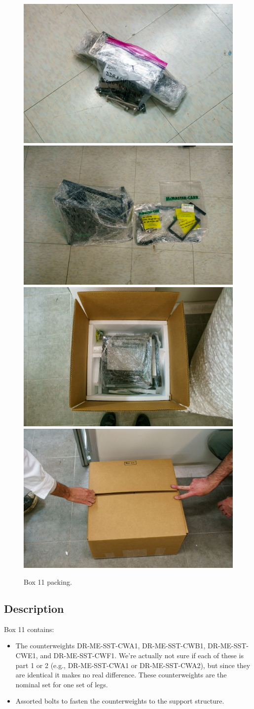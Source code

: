 \documentclass{article}
\begin{document}
\begin{figure}[bp]
\begin{center}
\includegraphics[width=0.40\linewidth]{figures/20201208T182441.jpg}
\includegraphics[width=0.40\linewidth]{figures/20201208T183054.jpg}\\[\smallskipamount]
\includegraphics[width=0.40\linewidth]{figures/20201208T183316.jpg}
\includegraphics[width=0.40\linewidth]{figures/20201208T183627.jpg}
\end{center}
\caption{Box 11 packing.}
\label{figure:box-eleven-packing}
\end{figure}

\subsection{Description}

Box 11 contains:

\begin{itemize}
    \item The counterweights DR-ME-SST-CWA1, DR-ME-SST-CWB1, DR-ME-SST-CWE1, and DR-ME-SST-CWF1. We're actually not sure if each of these is part 1 or 2 (e.g., DR-ME-SST-CWA1 or DR-ME-SST-CWA2), but since they are identical it makes no real difference. These counterweights are the nominal set for one set of legs.
    \item Assorted bolts to fasten the counterweights to the support structure.
\end{itemize}
\end{document}
